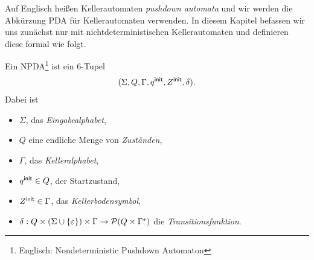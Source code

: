 Auf Englisch heißen Kellerautomaten \emph{pushdown automata} und wir werden die Abkürzung \ac{PDA} für Kellerautomaten verwenden. 
In diesem Kapitel befassen wir uns zunächst nur mit nichtdeterministischen Kellerautomaten und definieren diese formal wie folgt.


\begin{Def}[name={[NPDA]}]
        Ein \ac{NPDA}\footnote{Englisch: Nondeterministic Pushdown Automaton} ist ein 6-Tupel 
        $$(\Sigma,Q,\Gamma,q^\mathsf{init},Z^\mathsf{init},\delta).$$
        Dabei ist
        \begin{itemize}
		\item $\Sigma$, das \emph{Eingabealphabet},
                \item $Q$ eine endliche Menge von \emph{Zuständen},
                \item $\Gamma$, das \emph{Kelleralphabet},
                \item $q^\mathsf{init}\in Q$, der Startzustand,
                \item $Z^\mathsf{init}\in\Gamma$, das \emph{Kellerbodensymbol},
                \item $\delta: Q\x(\Sigma\cup\{\Eps\})\x\Gamma \-> \mathcal{P}(Q\x\Gamma^*)$ die \emph{Transitionsfunktion}. \qedhere
        \end{itemize}
\end{Def}


